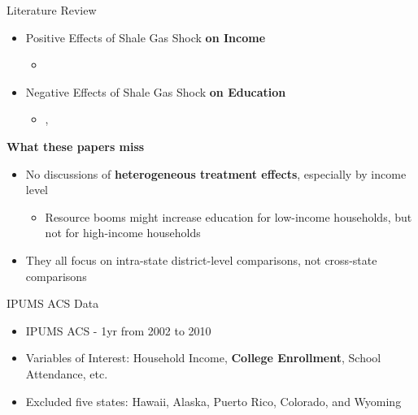 \documentclass[aspectratio=169,xcolor=dvipsnames]{beamer}
\begin{document}
\begin{frame}{Literature Review}
\begin{itemize}
    \item Positive Effects of Shale Gas Shock \textbf{on Income}
    \begin{itemize}
        \item \textcite{weinstein2011economic}
    \end{itemize}
    
    \item Negative Effects of Shale Gas Shock \textbf{on Education}
    \begin{itemize}
        \item \textcite{rickman2017shale}, \textcite{carpenter2019texas}
    \end{itemize}
\end{itemize}

\vspace{0.5cm}

\textbf{What these papers miss}

\begin{itemize}
        \item No discussions of \textbf{heterogeneous treatment effects}, especially by income level
        \begin{itemize}
            \item Resource booms might increase education for low-income households, but not for high-income households
        \end{itemize}
        \item They all focus on intra-state district-level comparisons, not cross-state comparisons
\end{itemize}
\end{frame}
\begin{frame}{IPUMS ACS Data}
    \footnotesize
    \begin{itemize}
        \item IPUMS ACS - 1yr from 2002 to 2010
        \item Variables of Interest: Household Income, \textbf{College Enrollment}, School Attendance, etc.
        \item Excluded five states: Hawaii, Alaska, Puerto Rico, Colorado, and Wyoming
    \end{itemize}

\end{frame}
\end{document}
